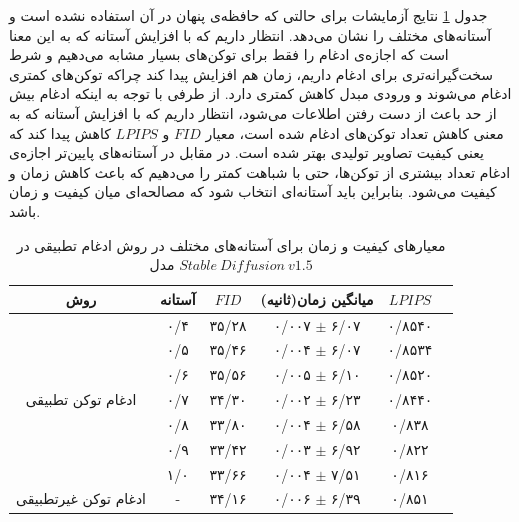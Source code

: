 جدول \ref{tab:metrics} نتایج آزمایشات برای حالتی که حافظه‌ی پنهان در آن استفاده نشده است و آستانه‌های مختلف را نشان می‌دهد. انتظار داریم که با افزایش آستانه که به این معنا است که اجازه‌ی ادغام را فقط برای توکن‌های بسیار مشابه می‌دهیم و شرط سخت‌گیرانه‌تری برای ادغام داریم، زمان ‌هم افزایش پیدا کند چراکه توکن‌های کمتری ادغام می‌شوند و ورودی مبدل کاهش کمتری دارد. از طرفی با توجه به اینکه ادغام بیش از حد باعث از دست رفتن اطلاعات می‌شود، انتظار داریم که با افزایش آستانه که به معنی کاهش تعداد توکن‌های ادغام شده است، معیار $FID$ و $LPIPS$ کاهش پیدا کند که یعنی کیفیت تصاویر تولیدی بهتر شده است. در مقابل در آستانه‌های پایین‌تر اجازه‌ی ادغام تعداد بیشتری از توکن‌ها، حتی با شباهت کمتر را می‌دهیم که باعث کاهش زمان و کیفیت می‌شود. بنابراین باید آستانه‌ای انتخاب شود که مصالحه‌ای میان کیفیت و زمان باشد.

\begin{table}[h!]
	\centering
	\caption{معیار‌های کیفیت و زمان برای آستانه‌های مختلف در روش ادغام تطبیقی در مدل $Stable\ Diffusion\ v1.5$}
	\begin{tabular}{|c|c|c|c|c|c|}
		\hline
		\textbf{روش} & \textbf{آستانه} & \textbf{$FID$} & \textbf{میانگین زمان(ثانیه)} & $LPIPS$\\ \hline
		\multirow{7}{*}{ادغام توکن تطبیقی} & ۰/۴ & ۳۵/۲۸ &۰/۰۰۷ $\pm$ ۶/۰۷& ۰/۸۵۴۰   \\ \cline{2-5}
		& ۰/۵ & ۳۵/۴۶ & ۰/۰۰۴ $\pm$ ۶/۰۷ & ۰/۸۵۳۴   \\ \cline{2-5}
		& ۰/۶ & ۳۵/۵۶ &۰/۰۰۵  $\pm$ ۶/۱۰  & ۰/۸۵۲۰ \\ \cline{2-5}
		& ۰/۷ & ۳۴/۳۰ & ۰/۰۰۲ $\pm$ ۶/۲۳  & ۰/۸۴۴۰  \\ \cline{2-5}
		& ۰/۸ & ۳۳/۸۰ & ۰/۰۰۴ $\pm$ ۶/۵۸  & ۰/۸۳۸ \\ \cline{2-5}
		& ۰/۹ & ۳۳/۴۲ & ۰/۰۰۳  $\pm$ ۶/۹۲  & ۰/۸۲۲ \\ \cline{2-5}
		& ۱/۰ & ۳۳/۶۶ & ۰/۰۰۴ $\pm$ ۷/۵۱  & ۰/۸۱۶  \\ \hline
		ادغام توکن غیرتطبیقی & - & ۳۴/۱۶ & ۰/۰۰۶ $\pm$ ۶/۳۹ & ۰/۸۵۱  \\ \hline
	\end{tabular}
	\label{tab:metrics}
\end{table}

